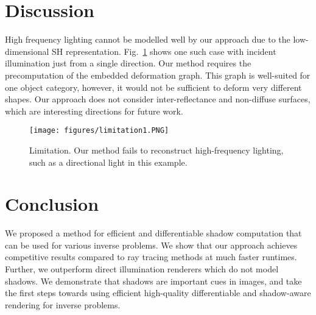 %
\section{Discussion}
%
%
High frequency lighting cannot be modelled well by our approach due to the low-dimensional SH representation.
%
Fig.~\ref{fig:limitaion} shows one such case with incident illumination just from a single direction. 
%
Our method requires the precomputation of the embedded deformation graph. 
%
This graph is well-suited for one object category, however, it would not be sufficient to deform very different shapes.
%
Our approach does not consider inter-reflectance and non-diffuse surfaces, which are interesting directions for future work. 
%
%
\begin{figure}
	\texttt{[image: figures/limitation1.PNG]} 
	\caption
	{
		Limitation.
	    Our method fails to reconstruct high-frequency lighting, such as a directional light in this example.
	}
	\label{fig:limitaion}
\end{figure}
%
%
\section{Conclusion}
%
%
We proposed a method for efficient and differentiable shadow computation that can be used for various inverse problems. 
%
We show that our approach achieves competitive results compared to ray tracing methods at much faster runtimes.
%
Further, we outperform direct illumination renderers which do not model shadows.
%
We demonstrate that shadows are important cues in images, and take the first steps towards using efficient high-quality differentiable and shadow-aware rendering for inverse problems.
%
